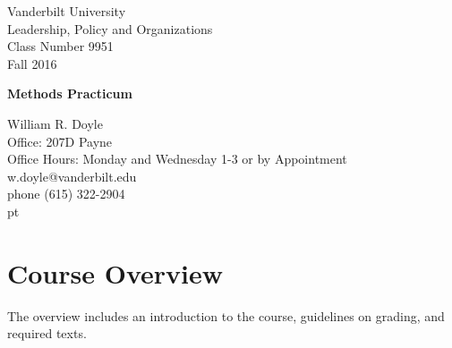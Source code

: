 \documentclass[12pt]{article}
\begin{document}


\thispagestyle{empty}%


\setlength{\parskip}{1ex plus 0.5ex minus 0.2ex}

\setcounter{secnumdepth}{-2}



\begin{flushleft}
Vanderbilt University\\
Leadership, Policy and Organizations\\
Class Number 9951\\ 
Fall 2016\\
\end{flushleft}

\begin{center}
\Large{\textbf{Methods Practicum}}\\
\end{center}

\begin{flushleft}
William R. Doyle\\
Office: 207D Payne\\
Office Hours: Monday and Wednesday 1-3 or by Appointment \\
w.doyle@vanderbilt.edu\\
phone (615) 322-2904\\

 pt

\end{flushleft}

\section{Course Overview}%

The overview includes an introduction to the course, guidelines on grading, and required texts.
\end{document}
